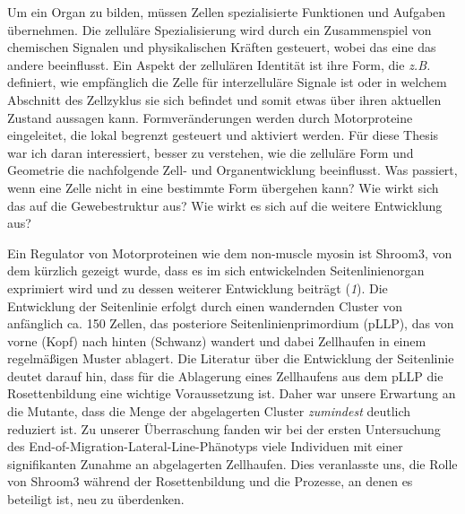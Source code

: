\documentclass[10pt, b5paper, singlespacinge, twoside]{reedthesis} %
\theoremstyle{definition}
\theoremstyle{definition}
\theoremstyle{definition}
\theoremstyle{remark}
\begin{document}
Um ein Organ zu bilden, müssen Zellen spezialisierte Funktionen und Aufgaben übernehmen. Die zelluläre Spezialisierung wird durch ein Zusammenspiel von chemischen Signalen und physikalischen Kräften gesteuert, wobei das eine das andere beeinflusst. Ein Aspekt der zellulären Identität ist ihre Form, die \emph{z.B.} definiert, wie empfänglich die Zelle für interzelluläre Signale ist oder in welchem Abschnitt des Zellzyklus sie sich befindet und somit etwas über ihren aktuellen Zustand aussagen kann. Formveränderungen werden durch Motorproteine eingeleitet, die lokal begrenzt gesteuert und aktiviert werden. Für diese Thesis war ich daran interessiert, besser zu verstehen, wie die zelluläre Form und Geometrie die nachfolgende Zell- und Organentwicklung beeinflusst. Was passiert, wenn eine Zelle nicht in eine bestimmte Form übergehen kann? Wie wirkt sich das auf die Gewebestruktur aus? Wie wirkt es sich auf die weitere Entwicklung aus?

Ein Regulator von Motorproteinen wie dem non-muscle myosin ist Shroom3, von dem kürzlich gezeigt wurde, dass es im sich entwickelnden Seitenlinienorgan exprimiert wird und zu dessen weiterer Entwicklung beiträgt (\emph{1}). Die Entwicklung der Seitenlinie erfolgt durch einen wandernden Cluster von anfänglich ca. 150 Zellen, das posteriore Seitenlinienprimordium (pLLP), das von vorne (Kopf) nach hinten (Schwanz) wandert und dabei Zellhaufen in einem regelmäßigen Muster ablagert. Die Literatur über die Entwicklung der Seitenlinie deutet darauf hin, dass für die Ablagerung eines Zellhaufens aus dem pLLP die Rosettenbildung eine wichtige Voraussetzung ist. Daher war unsere Erwartung an die Mutante, dass die Menge der abgelagerten Cluster \emph{zumindest} deutlich reduziert ist. Zu unserer Überraschung fanden wir bei der ersten Untersuchung des End-of-Migration-Lateral-Line-Phänotyps viele Individuen mit einer signifikanten Zunahme an abgelagerten Zellhaufen. Dies veranlasste uns, die Rolle von Shroom3 während der Rosettenbildung und die Prozesse, an denen es beteiligt ist, neu zu überdenken.
\end{document}
